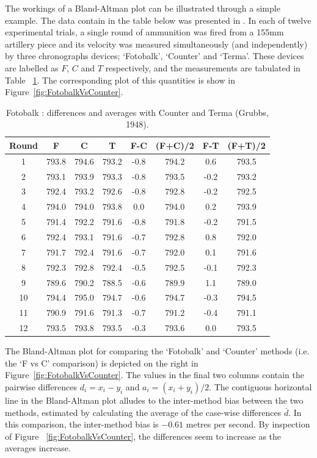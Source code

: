 \documentclass[12pt, a4paper]{report}
\theoremstyle{plain}
\theoremstyle{definition}
\theoremstyle{remark}
\begin{document}
The workings of a Bland-Altman plot can be illustrated through a simple example. The data contain in the table below was presented in \citet{Grubbs48}. In each of twelve experimental trials, a single round of ammunition was fired from a 155mm artillery piece and its velocity was measured simultaneously (and independently) by three chronographs devices; `Fotobalk', `Counter' and `Terma'. These devices are labelled as $F$, $C$ and $T$ respectively, and the measurements are tabulated in Table ~\ref{GrubbsData1}. The corresponding plot of this quantities is show in Figure~\ref{fig:FotobalkVsCounter}.
\begin{table}[h!]
	\renewcommand\arraystretch{0.9}%
	\begin{center}
		\begin{tabular}{|c||c|c|c||c|c|c|c|}
			\hline

Round	&  F & C & T &F-C &  (F+C)/2 & F-T &  (F+T)/2 \\
			\hline
			1 & 793.8 & 794.6 & 793.2 & -0.8 & 794.2 & 0.6 & 793.5 \\
			2 & 793.1 & 793.9 & 793.3 & -0.8 & 793.5 & -0.2 & 793.2 \\
			3 & 792.4 & 793.2 & 792.6 & -0.8 & 792.8 & -0.2 & 792.5 \\
			4 & 794.0 & 794.0 & 793.8 & 0.0 & 794.0 & 0.2 & 793.9 \\
			5 & 791.4 & 792.2 & 791.6 & -0.8 & 791.8 & -0.2 & 791.5 \\
			6 & 792.4 & 793.1 & 791.6 & -0.7 & 792.8 & 0.8 & 792.0 \\
			7 & 791.7 & 792.4 & 791.6 & -0.7 & 792.0 & 0.1 & 791.6 \\
			8 & 792.3 & 792.8 & 792.4 & -0.5 & 792.5 & -0.1 & 792.3 \\
			9 & 789.6 & 790.2 & 788.5 & -0.6 & 789.9 & 1.1 & 789.0 \\
			10 & 794.4 & 795.0 & 794.7 & -0.6 & 794.7 & -0.3 & 794.5 \\
			11 & 790.9 & 791.6 & 791.3 & -0.7 & 791.2 & -0.4 & 791.1 \\
			12 & 793.5 & 793.8 & 793.5 & -0.3 & 793.6 & 0.0 & 793.5 \\
			\hline
		\end{tabular}
		\caption{Fotobalk : differences and averages with Counter and Terma (Grubbs, 1948).}
		\label{GrubbsData1}
	\end{center}
\end{table}
The Bland-Altman plot for comparing the `Fotobalk' and `Counter' methods (i.e. the `F vs C' comparison) is depicted on the right in Figure~\ref{fig:FotobalkVsCounter}.  The values in the final two columns contain the pairwise differences $d_i = x_i - y_i$ and $a_i = {(x_i + y_i)/2} $. The contiguous horizontal line in the Bland-Altman plot alludes to the inter-method bias between the two methods, estimated by calculating the average of the case-wise differences $\bar{d}$. In this comparison, the inter-method bias is $-0.61$ metres per second. By inspection of Figure ~\ref{fig:FotobalkVsCounter}, the differences seem to increase as the averages increase.
\end{document}
